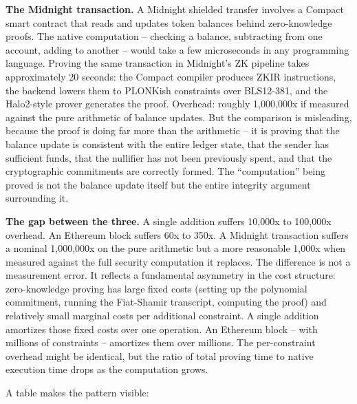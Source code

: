 \documentclass[
  11pt,
  openany]{report}
\renewcommand{\textbf}[1]{{\bfseries\color{MidnightBold}#1}}
\begin{document}
\textbf{The Midnight transaction.} A Midnight shielded transfer involves a
Compact smart contract that reads and updates token balances behind
zero-knowledge proofs. The native computation -- checking a balance, subtracting
from one account, adding to another -- would take a few microseconds in any
programming language. Proving the same transaction in Midnight's ZK pipeline
takes approximately 20 seconds: the Compact compiler produces ZKIR instructions,
the backend lowers them to PLONKish constraints over BLS12-381, and the
Halo2-style prover generates the proof. Overhead: roughly 1,000,000x if measured
against the pure arithmetic of balance updates. But the comparison is
misleading, because the proof is doing far more than the arithmetic -- it is
proving that the balance update is consistent with the entire ledger state, that
the sender has sufficient funds, that the nullifier has not been previously
spent, and that the cryptographic commitments are correctly formed. The
``computation'' being proved is not the balance update itself but the entire
integrity argument surrounding it.

\textbf{The gap between the three.} A single addition suffers 10,000x to
100,000x overhead. An Ethereum block suffers 60x to 350x. A Midnight transaction
suffers a nominal 1,000,000x on the pure arithmetic but a more reasonable 1,000x
when measured against the full security computation it replaces. The difference
is not a measurement error. It reflects a fundamental asymmetry in the cost
structure: zero-knowledge proving has large fixed costs (setting up the
polynomial commitment, running the Fiat-Shamir transcript, computing the proof)
and relatively small marginal costs per additional constraint. A single addition
amortizes those fixed costs over one operation. An Ethereum block -- with
millions of constraints -- amortizes them over millions. The per-constraint
overhead might be identical, but the ratio of total proving time to native
execution time drops as the computation grows.

A table makes the pattern visible:
\end{document}
